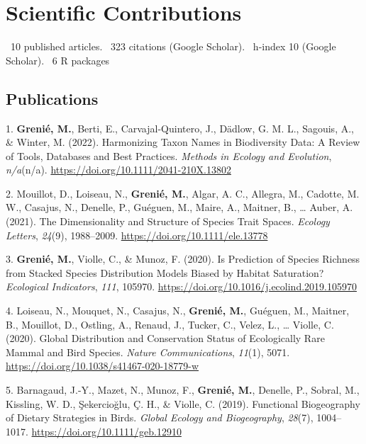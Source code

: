 \documentclass[10pt,a4paper,]{article}
\begin{document}
\hypertarget{scientific-contributions}{%
\section{Scientific Contributions}\label{scientific-contributions}}

\faFile*~10 published articles. \faQuoteLeft~323 citations (Google
Scholar). \faHSquare~h-index 10 (Google Scholar). \faRProject~6 R
packages

\hypertarget{publications}{%
\subsection{Publications}\label{publications}}

\hypertarget{bibliography}{}
\leavevmode\hypertarget{ref-Grenie_Harmonizing_}{}%
1. \textbf{Grenié, M.}, Berti, E., Carvajal-Quintero, J., Dädlow, G. M.
L., Sagouis, A., \& Winter, M. (2022). Harmonizing Taxon Names in
Biodiversity Data: A Review of Tools, Databases and Best Practices.
\emph{Methods in Ecology and Evolution}, \emph{n/a}(n/a).
\url{https://doi.org/10.1111/2041-210X.13802}

\leavevmode\hypertarget{ref-Mouillot_dimensionality_2021}{}%
2. Mouillot, D., Loiseau, N., \textbf{Grenié, M.}, Algar, A. C.,
Allegra, M., Cadotte, M. W., Casajus, N., Denelle, P., Guéguen, M.,
Maire, A., Maitner, B., \ldots{} Auber, A. (2021). The Dimensionality
and Structure of Species Trait Spaces. \emph{Ecology Letters},
\emph{24}(9), 1988--2009. \url{https://doi.org/10.1111/ele.13778}

\leavevmode\hypertarget{ref-Grenie_prediction_2020}{}%
3. \textbf{Grenié, M.}, Violle, C., \& Munoz, F. (2020). Is Prediction
of Species Richness from Stacked Species Distribution Models Biased by
Habitat Saturation? \emph{Ecological Indicators}, \emph{111}, 105970.
\url{https://doi.org/10.1016/j.ecolind.2019.105970}

\leavevmode\hypertarget{ref-Loiseau_Global_2020}{}%
4. Loiseau, N., Mouquet, N., Casajus, N., \textbf{Grenié, M.}, Guéguen,
M., Maitner, B., Mouillot, D., Ostling, A., Renaud, J., Tucker, C.,
Velez, L., \ldots{} Violle, C. (2020). Global Distribution and
Conservation Status of Ecologically Rare Mammal and Bird Species.
\emph{Nature Communications}, \emph{11}(1), 5071.
\url{https://doi.org/10.1038/s41467-020-18779-w}

\leavevmode\hypertarget{ref-Barnagaud_Functional_2019}{}%
5. Barnagaud, J.-Y., Mazet, N., Munoz, F., \textbf{Grenié, M.}, Denelle,
P., Sobral, M., Kissling, W. D., Şekercioğlu, Ç. H., \& Violle, C.
(2019). Functional Biogeography of Dietary Strategies in Birds.
\emph{Global Ecology and Biogeography}, \emph{28}(7), 1004--1017.
\url{https://doi.org/10.1111/geb.12910}
\end{document}
